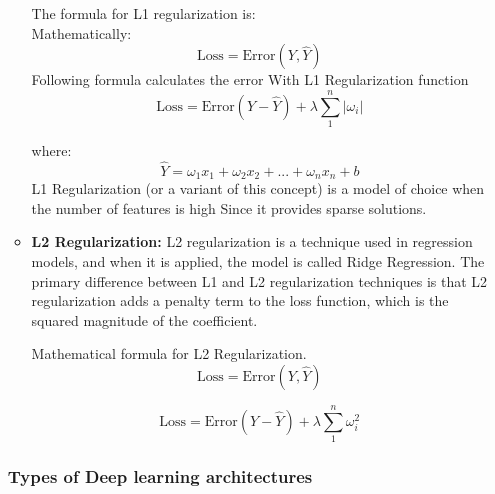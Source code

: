 \begin{itemize}
\begin{itemize}
    The formula for L1 regularization is:\\
    Mathematically:\\
    
    \[
    \text{Loss}=\text{Error}(Y,\hat{Y})
    \]
    Following formula calculates the error With L1 Regularization function
    \[
    \text{Loss}=\text{Error}(Y-\hat{Y}) + \lambda\sum_{1}^{n}|\omega_{i}|
    \]
    
    where:\\
    \[
    \hat{Y}=\omega_{1} x_{1}+\omega_{2} x_{2}+...+\omega_{n}x_{n}+b
    \]
    L1 Regularization (or a variant of this concept) is a model of choice when the number of features is high Since it provides sparse solutions.\\
    
    \item \textbf{L2 Regularization: } L2 regularization is a technique used in regression models, and when it is applied, the model is called Ridge Regression. The primary difference between L1 and L2 regularization techniques is that L2 regularization adds a penalty term to the loss function, which is the squared magnitude of the coefficient. \cite{kukavcka2017regularization}

    Mathematical formula for L2 Regularization.
    \[
    \text{Loss}=\text{Error}(Y,\hat{Y})
    \]
    
    \[
    \text{Loss}=\text{Error}(Y-\hat{Y}) + \lambda\sum_{1}^{n}\omega_{i}^{2}
    \]
    
\end{itemize}

\subsubsection{Types of Deep learning architectures}


\end{itemize}
